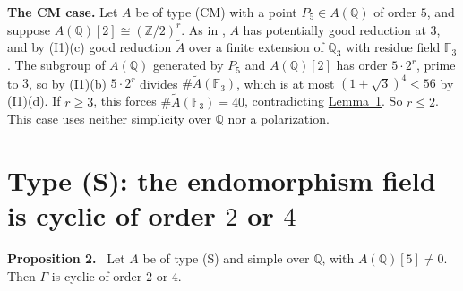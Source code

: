 \documentclass[11pt]{article}
\newenvironment{statement}[1]{\par\medskip\noindent\phantomsection\textbf{#1}\ }{\par\medskip}
\newcommand{\Q}{\mathbb Q}
\newcommand{\Z}{\mathbb Z}
\newcommand{\F}{\mathbb F}
\begin{document}
\medskip
\textbf{The CM case.} Let \(A\) be of type (CM) with a point \(P_5\in A(\Q)\) of order \(5\), and
suppose \(A(\Q)[2]\cong(\Z/2)^r\). As in \cite[Section~3]{P2214}, \(A\) has potentially good reduction
at \(3\), and by (I1)(c) good reduction \(\widetilde A\) over a finite extension of \(\Q_3\) with
residue field \(\F_3\). The subgroup of \(A(\Q)\) generated by \(P_5\) and \(A(\Q)[2]\) has order
\(5\cdot2^r\), prime to \(3\), so by (I1)(b) \(5\cdot2^r\) divides \(\#\widetilde A(\F_3)\),
which is at most \((1+\sqrt3)^4<56\) by (I1)(d). If \(r\ge3\), this forces \(\#\widetilde A(\F_3)=40\), contradicting
\hyperref[lemma-f3]{Lemma~1}. So \(r\le2\). This case uses neither simplicity over \(\Q\) nor a
polarization.

\section{Type (S): the endomorphism field is cyclic of order \(2\) or \(4\)}\label{gamma}

\begin{statement}{Proposition 2.}\label{prop-gamma}
Let \(A\) be of type (S) and simple over \(\Q\), with \(A(\Q)[5]\neq0\). Then \(\Gamma\) is
cyclic of order \(2\) or \(4\).
\end{statement}
\end{document}
